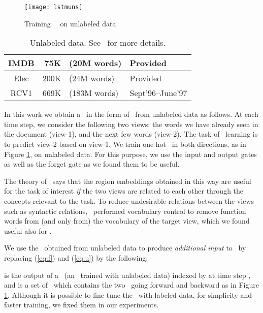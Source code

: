 \documentclass{article}
\begin{document}
\begin{figure}[h]
\centering
\texttt{[image: lstmuns]}
\vskip -0.15in
\caption{\label{fig:lstmuns}
Training \lstm\ \tvEmbs\ on unlabeled data
}
\end{figure}


\begin{table}[t]
\begin{center}
\begin{small}
\begin{tabular}{|c|rl|l|}   
\hline
IMDB & 75K &(20M words) & Provided \\
\hline
Elec & 200K &(24M words) & Provided \\
\hline
RCV1 & 669K &(183M words) & Sept'96--June'97 \\
\hline
\end{tabular}
\end{small}
\vskip -0.05in
\caption{ \label{tab:unlab} 
Unlabeled data.  See \JZb\ for more details. 
}
\end{center}
\end{table}
In this work
we obtain a \tvEmb\ in the form of \lstm\ from unlabeled data as follows. 
At each time step, we consider the following two views: the words we have already seen in the document (view-1), 
and the next few words (view-2).  The task of \tvEmb\ learning is 
to predict view-2 based on view-1.  We train one-hot \lstms\ in both directions, as in Figure \ref{fig:lstmuns}, 
on unlabeled data.  For this purpose, we use the input and output gates as well as the forget gate 
as we found them to be useful.  

The theory of \tvEmb\ says that 
the region embeddings obtained in this way are useful for the task of interest {\em if}
the two views are related to each other through the concepts relevant to the task. 
To reduce undesirable relations between the views such as syntactic relations, \JZb\ performed 
vocabulary control to remove function words from (and only from) 
the vocabulary of the target view, which we found useful also for \lstm.   

\newcommand{\embIdx}{j}
\newcommand{\embSet}{S}
We use the \tvEmbs\ obtained from unlabeled data to produce {\em additional input} to 
\lstm\ by replacing (\ref{eq:f}) and (\ref{eq:u}) by the following: 

 is the output of a \tvEmb\ (an \lstm\ trained with unlabeled data)
indexed by  at time step , and 
 is a set of \tvEmbs\ which contains the two \lstms\ going forward and backward as in Figure \ref{fig:lstmuns}. 
Although it is possible to fine-tune the \tvEmbs\ with labeled data, for simplicity and faster training, 
we fixed them in our experiments. 
\end{document}
